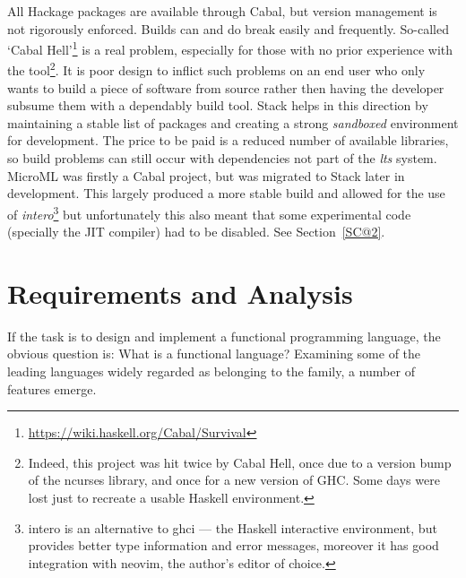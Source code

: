 \documentclass[12pt, a4paper]{report}
\begin{document}
All Hackage packages are available through Cabal, but version management is not
rigorously enforced. Builds can and do break easily and frequently. So-called `Cabal
Hell'\footnote{\url{https://wiki.haskell.org/Cabal/Survival}} is a real problem, especially for
those with no prior experience with the tool\footnote{Indeed, this project was hit twice by Cabal
Hell, once due to a version bump of the ncurses library, and once for a new version of GHC\@.
Some days were lost just to recreate a usable Haskell environment.}. It is poor design to inflict
such problems on an end user who only wants to build a piece of software from source rather then
having the developer subsume them with a dependably build tool. Stack helps in this direction by
maintaining a stable list of packages and creating a strong \textit{sandboxed} environment for
development. The price to be paid is a reduced number of available libraries, so build problems
can still occur with dependencies not part of the \textit{\gls{lts}} system. MicroML was firstly a Cabal
project, but was migrated to Stack later in development. This largely produced a more stable build
and allowed for the use of \textit{intero}\footnote{intero is an alternative to ghci --- the Haskell
interactive environment, but provides better type information and error messages, moreover it has
good integration with neovim, the author's editor of choice.} but unfortunately this also meant that some
experimental code (specially the JIT compiler) had to be disabled. See Section~\ref{SC@2}.



\chapter{Requirements and Analysis}

If the task is to design and implement a functional programming language, the obvious question is: What is a functional language? 
Examining some of the leading languages widely regarded as belonging to the family, a number of
features emerge.
\end{document}
